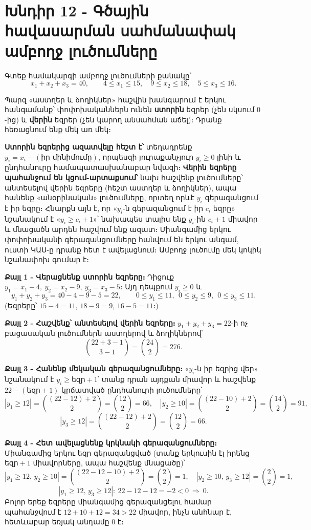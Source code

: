 \documentclass[11pt,a4paper]{article}
\begin{document}
\section*{Խնդիր 12 - Գծային հավասարման սահմանափակ ամբողջ լուծումները}

\begin{problembox}[12]
Գտեք համակարգի ամբողջ լուծումների քանակը՝
$$x_1+x_2+x_3=40,\qquad 4\le x_1\le 15,\quad 9\le x_2\le 18,\quad 5\le x_3\le 16.$$
\end{problembox}

\begin{ideabox}
Պարզ «աստղեր և ձողիկներ» հաշվին խանգարում է երկու հանգամանք՝ փոփոխականներն ունեն \textbf{ստորին}
եզրեր (չեն սկսում $0$-ից) և \textbf{վերին} եզրեր (չեն կարող անսահման աճել)։ Դրանք հեռացնում
ենք մեկ առ մեկ։

\textbf{Ստորին եզրերից ազատվելը հեշտ է՝} տեղադրենք $y_i=x_i-(\text{իր մինիմումը})$, որպեսզի
յուրաքանչյուր $y_i\ge 0$ լինի և ընդհանուրը համապատասխանաբար նվազի։ \textbf{Վերին եզրերը
պահանջում են կցում-արտաքսում՝} նախ հաշվենք լուծումները՝ անտեսելով վերին եզրերը (հեշտ աստղեր և
ձողիկներ), ապա հանենք «անօրինական» լուծումները, որտեղ որևէ $y_i$ գերազանցում է իր եզրը։ Հնարքն
այն է, որ «$y_i$-ն գերազանցում է իր $c_i$ եզրը» նշանակում է «$y_i\ge c_i+1$»՝ նախապես տալիս ենք
$y_i$-ին $c_i+1$ միավոր և մնացածն արդեն հաշվում ենք ազատ։ Միանգամից երկու փոփոխականի գերազանցումները հանվում
են երկու անգամ, ուստի ԿԱՍ-ը դրանք հետ է ավելացնում։ Ամբողջ լուծումը մեկ կոկիկ նշանափոխ գումար է։
\end{ideabox}

\textbf{Քայլ 1 - Վերացնենք ստորին եզրերը։}
Դիցուք $y_1=x_1-4,\ y_2=x_2-9,\ y_3=x_3-5$։ Այդ դեպքում $y_i\ge 0$ և
$$y_1+y_2+y_3=40-4-9-5=22,\qquad 0\le y_1\le 11,\ \ 0\le y_2\le 9,\ \ 0\le y_3\le 11.$$
(Եզրերը՝ $15-4=11$, $18-9=9$, $16-5=11$։)

\textbf{Քայլ 2 - Հաշվենք՝ անտեսելով վերին եզրերը։}
$y_1+y_2+y_3=22$-ի ոչ բացասական լուծումներն աստղերով և ձողիկներով՝
$$\binom{22+3-1}{3-1}=\binom{24}{2}=276.$$

\textbf{Քայլ 3 - Հանենք մեկական գերազանցումները։}
«$y_i$-ն իր եզրից վեր» նշանակում է $y_i\ge \text{եզր}+1$՝ տանք դրան այդքան միավոր և հաշվենք
$22-(\text{եզր}+1)$ կրճատված ընդհանուրի լուծումները՝
$$|y_1\ge 12|=\binom{(22-12)+2}{2}=\binom{12}{2}=66,\quad
  |y_2\ge 10|=\binom{(22-10)+2}{2}=\binom{14}{2}=91,$$
$$|y_3\ge 12|=\binom{(22-12)+2}{2}=\binom{12}{2}=66.$$

\textbf{Քայլ 4 - Հետ ավելացնենք կրկնակի գերազանցումները։}
Միանգամից երկու եզր գերազանցված (տանք երկուսին էլ իրենց $\text{եզր}+1$ միավորները, ապա հաշվենք
մնացածը)՝
$$|y_1\ge12,\,y_2\ge10|=\binom{(22-12-10)+2}{2}=\binom{2}{2}=1,\quad
  |y_2\ge10,\,y_3\ge12|=\binom{2}{2}=1,$$
$$|y_1\ge12,\,y_3\ge12|:\ 22-12-12=-2<0\ \Rightarrow\ 0.$$
Բոլոր երեք եզրերը միանգամից գերազանցելու համար պահանջվում է $12+10+12=34>22$ միավոր, ինչն
անհնար է, հետևաբար եռյակ անդամը $0$ է։
\end{document}
